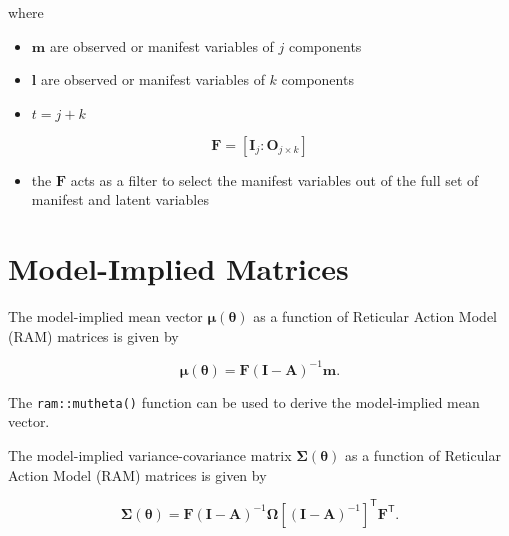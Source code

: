 \documentclass[
]{book}
\providecommand{\tightlist}{%
  \setlength{\itemsep}{0pt}\setlength{\parskip}{0pt}}
\begin{document}
\noindent where

\begin{itemize}
\tightlist
\item
  \(\mathbf{m}\) are observed or manifest variables of \(j\) components
\item
  \(\mathbf{l}\) are observed or manifest variables of \(k\) components
\item
  \(t = j + k\)
\end{itemize}

\begin{equation}
  \mathbf{F}
  =
  \left[
    \mathbf{I}_{j} \colon \mathbf{O}_{j \times k}
  \right]
\end{equation}

\begin{itemize}
\tightlist
\item
  the \(\mathbf{F}\) acts as a filter to select the manifest variables
  out of the full set of manifest and latent variables
\end{itemize}

\hypertarget{model-implied-matrices}{%
\section{Model-Implied Matrices}\label{model-implied-matrices}}

The model-implied mean vector
\(\boldsymbol{\mu} \left( \boldsymbol{\theta} \right)\)
as a function of Reticular Action Model (RAM) matrices
is given by

\begin{equation}
  \boldsymbol{\mu} \left( \boldsymbol{\theta} \right)
  =
  \mathbf{F}
  \left( \mathbf{I} - \mathbf{A} \right)^{-1}
  \mathbf{m} .
\end{equation}

\noindent The \texttt{ram::mutheta()} function can be used
to derive the model-implied mean vector.

The model-implied variance-covariance matrix
\(\boldsymbol{\Sigma} \left( \boldsymbol{\theta} \right)\)
as a function of Reticular Action Model (RAM) matrices
is given by

\begin{equation}
  \boldsymbol{\Sigma} \left( \boldsymbol{\theta} \right)
  =
  \mathbf{F}
  \left( \mathbf{I} - \mathbf{A} \right)^{-1}
  \boldsymbol{\Omega}
  \left[ \left( \mathbf{I} - \mathbf{A} \right)^{-1} \right]^{\mathsf{T}}
  \mathbf{F}^{\mathsf{T}} .
\end{equation}
\end{document}
